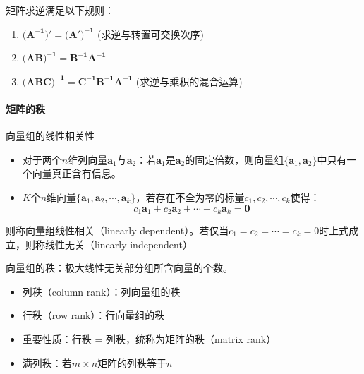 \begin{flushleft}
	矩阵求逆满足以下规则：
\end{flushleft}
\begin{enumerate}
	\item $(\mathbf{A^{-1})'} = (\mathbf{A')^{-1}}$ \hfill (求逆与转置可交换次序)
	\item $(\mathbf{AB)^{-1}} = \mathbf{B^{-1}}\mathbf{A^{-1}}$
	\item $(\mathbf{ABC)^{-1}} = \mathbf{C^{-1}}\mathbf{B^{-1}}\mathbf{A^{-1}}$ \hfill (求逆与乘积的混合运算)
\end{enumerate}

\paragraph*{矩阵的秩}
向量组的线性相关性
\begin{itemize}
	\item 对于两个$n$维列向量$\mathbf{a}_1$与$\mathbf{a}_2$：若$\mathbf{a}_1$是$\mathbf{a}_2$的固定倍数，则向量组$\{\mathbf{a}_1, \mathbf{a}_2\}$中只有一个向量真正含有信息。
	
	\item $K$个$n$维向量$\{\mathbf{a}_1, \mathbf{a}_2, \cdots, \mathbf{a}_k\}$，若存在不全为零的标量$c_1, c_2, \cdots, c_k$使得：
	\begin{equation}
		c_1 \mathbf{a}_1 + c_2 \mathbf{a}_2 + \cdots + c_k \mathbf{a}_k = \mathbf{0}
	\end{equation}
\end{itemize}

\begin{flushleft}
则称向量组线性相关（linearly dependent）。若仅当$c_1 = c_2 = \cdots = c_k = 0$时上式成立，则称线性无关（linearly independent）
\end{flushleft}



\begin{flushleft}
向量组的秩：极大线性无关部分组所含向量的个数。
\end{flushleft}

\begin{itemize}
	\item 列秩（column rank）：列向量组的秩
	\item 行秩（row rank）：行向量组的秩
	\item 重要性质：行秩 = 列秩，统称为矩阵的秩（matrix rank）
	\item 满列秩：若$m \times n$矩阵的列秩等于$n$
\end{itemize}

